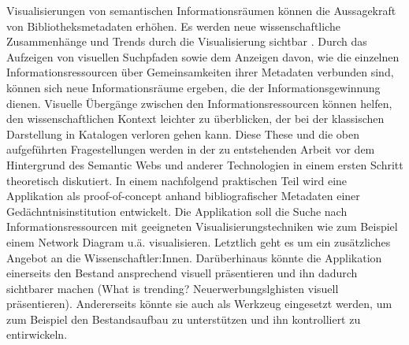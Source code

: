 \documentclass[10pt,a4paper,twocolumn,conference]{IEEEtran}
\begin{document}
Visualisierungen von semantischen Informationsräumen können die Aussagekraft von Bibliotheksmetadaten erhöhen. Es werden
neue wissenschaftliche Zusammenhänge und Trends durch die Visualisierung
sichtbar \cite{RN1}. Durch das Aufzeigen von visuellen Suchpfaden sowie dem
Anzeigen davon, wie die einzelnen Informationsressourcen über Gemeinsamkeiten ihrer
Metadaten verbunden sind, können sich neue Informationsräume ergeben, die der
Informationsgewinnung dienen. Visuelle Übergänge zwischen den
Informationsressourcen können helfen, den wissenschaftlichen Kontext leichter
zu überblicken, der bei der klassischen Darstellung in Katalogen verloren gehen kann. 
Diese These und die oben aufgeführten Fragestellungen werden in der zu
entstehenden Arbeit vor dem Hintergrund des Semantic Webs und
anderer Technologien in einem ersten Schritt theoretisch diskutiert.
In einem nachfolgend praktischen Teil wird eine Applikation als proof-of-concept anhand 
bibliografischer Metadaten einer Gedächntnisinstitution entwickelt. 
Die Applikation soll die Suche nach Informationsressourcen mit geeigneten
Visualisierungstechniken wie zum Beispiel einem Network Diagram u.ä. visualisieren. 
Letztlich geht es um ein zusätzliches Angebot an die Wissenschaftler:Innen. 
Darüberhinaus könnte die Applikation einerseits den Bestand ansprechend visuell
präsentieren und ihn dadurch sichtbarer machen (What is trending?
Neuerwerbungslghisten visuell präsentieren). Andererseits könnte sie
auch als Werkzeug eingesetzt werden, um zum Beispiel den
Bestandsaufbau zu unterstützen und ihn kontrolliert zu entirwickeln. 
\end{document}
